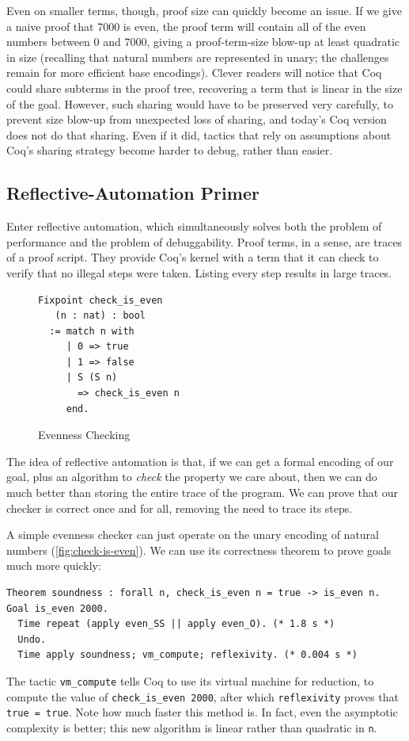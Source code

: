 Even on smaller terms, though, proof size can quickly become an issue.
If we give a naive proof that 7000 is even, the proof term will contain all of the even numbers between 0 and 7000, giving a proof-term-size blow-up at least quadratic in size (recalling that natural numbers are represented in unary; the challenges remain for more efficient base encodings).
Clever readers will notice that Coq could share subterms in the proof tree, recovering a term that is linear in the size of the goal.
However, such sharing would have to be preserved very carefully, to prevent size blow-up from unexpected loss of sharing, and today's Coq version does not do that sharing.
Even if it did, tactics that rely on assumptions about Coq's sharing strategy become harder to debug, rather than easier.

\subsection{Reflective-Automation Primer}\label{sec:evenness}
Enter reflective automation, which simultaneously solves both the problem of performance and the problem of debuggability.
Proof terms, in a sense, are traces of a proof script.
They provide Coq's kernel with a term that it can check to verify that no illegal steps were taken.
Listing every step results in large traces.

\begin{figure}
\begin{verbatim}
Fixpoint check_is_even
   (n : nat) : bool
  := match n with
     | 0 => true
     | 1 => false
     | S (S n)
       => check_is_even n
     end.
\end{verbatim}
\caption{Evenness Checking}\label{fig:check-is-even}
\end{figure}
The idea of reflective automation is that, if we can get a formal encoding of our goal, plus an algorithm to \emph{check} the property we care about, then we can do much better than storing the entire trace of the program.
We can prove that our checker is correct once and for all, removing the need to trace its steps.

A simple evenness checker can just operate on the unary encoding of natural numbers (\autoref{fig:check-is-even}).
We can use its correctness theorem to prove goals much more quickly:
\begin{verbatim}
Theorem soundness : forall n, check_is_even n = true -> is_even n.
Goal is_even 2000.
  Time repeat (apply even_SS || apply even_O). (* 1.8 s *)
  Undo.
  Time apply soundness; vm_compute; reflexivity. (* 0.004 s *)
\end{verbatim}
The tactic \texttt{vm\_compute} tells Coq to use its virtual machine for reduction, to compute the value of \texttt{check\_is\_even 2000}, after which \texttt{reflexivity} proves that \texttt{true = true}.
Note how much faster this method is.
In fact, even the asymptotic complexity is better; this new algorithm is linear rather than quadratic in \texttt{n}.

